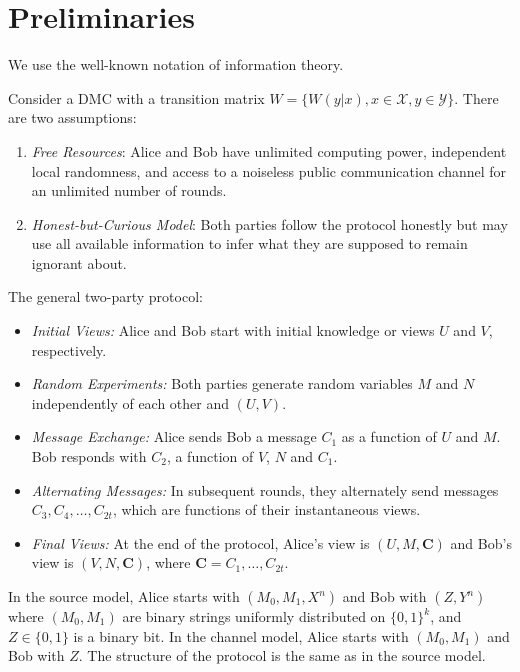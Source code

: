 \documentclass[runningheads]{llncs}
\newcommand{\parbreak}{ \vspace{0.3 em}}
\newcounter{protocol}
\begin{document}


\parbreak

\section{Preliminaries}\label{Sec: pre}
We use the well-known notation of information theory.

Consider a DMC with a transition matrix 
$W=\lbrace W(y|x),x \in\mathcal{X}, y \in\mathcal{Y} \rbrace$. There are two assumptions:
\begin{enumerate}
    \item \emph{Free Resources}: Alice and Bob have unlimited computing power, independent local randomness, and access to a noiseless public communication channel for an unlimited number of rounds.
    \item \emph{Honest-but-Curious Model}: Both parties follow the protocol honestly but may use all available information to infer what they are supposed to remain ignorant about.
\end{enumerate} 

The general two-party protocol:
\begin{itemize}
    \item \emph{Initial Views:} Alice and Bob start with initial knowledge or views $U$ and $V$, respectively.
    \item \emph{Random Experiments:} Both parties generate random variables $M$ and $N$ independently of each other and $(U,V)$.
    
    \item \emph{Message Exchange:} Alice sends Bob a message $C_1$ as a function of $U$ and $M$. Bob responds with $C_2$, a function of $V$, $N$ and $C_1$.

    \item \emph{Alternating Messages:} In subsequent rounds, they alternately send messages $C_3, C_4,\dots, C_{2t}$, which are functions of their instantaneous views.
    \item \emph{Final Views:} At the end of the protocol, Alice's view is $(U,M,\mathbf{C})$ and Bob's view is $(V,N,\mathbf{C})$, where $\mathbf{C}=C_1,\dots, C_{2t}$.

\end{itemize}
In the source model, Alice starts with $(M_0,M_1,X^n)$ and Bob with $(Z,Y^n)$ where $(M_0,M_1)$ are binary strings uniformly distributed on $\lbrace0,1\rbrace^k$, and $Z\in \lbrace 0,1\rbrace$ is a binary bit.
In the channel model, Alice starts with $(M_0,M_1)$ and Bob with $Z$. The structure of the protocol is the same as in the source model.
\end{document}
